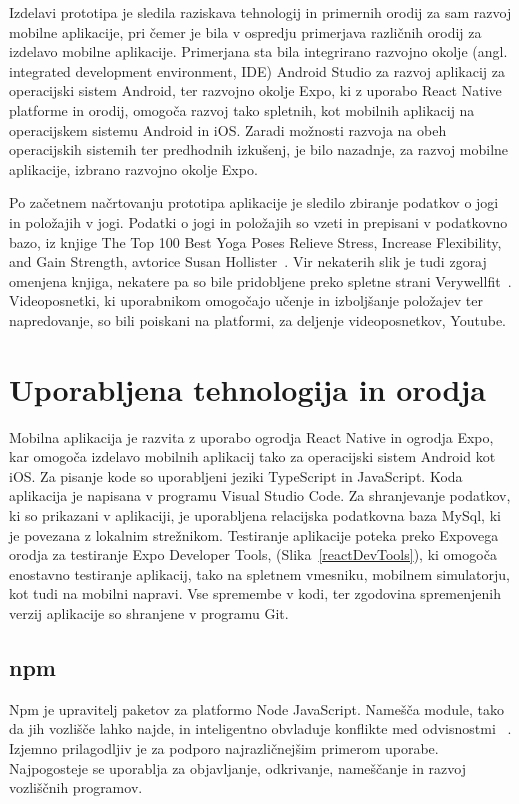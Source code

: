 \documentclass[a4paper, 12pt]{book}
\begin{document}
Izdelavi prototipa je sledila raziskava tehnologij in primernih orodij za sam razvoj mobilne aplikacije, pri čemer je bila v ospredju primerjava različnih orodij za izdelavo mobilne aplikacije. Primerjana sta bila integrirano razvojno okolje (angl. integrated development environment, IDE) Android Studio za razvoj aplikacij za operacijski sistem Android, ter razvojno okolje Expo, ki z uporabo React Native platforme in orodij, omogoča razvoj tako spletnih, kot mobilnih aplikacij na operacijskem sistemu Android in iOS. Zaradi možnosti razvoja na obeh operacijskih sistemih ter predhodnih izkušenj, je bilo nazadnje, za razvoj mobilne aplikacije, izbrano razvojno okolje Expo.

Po začetnem načrtovanju prototipa aplikacije je sledilo zbiranje podatkov o jogi in položajih v jogi. Podatki o jogi in položajih so vzeti in prepisani v podatkovno bazo, iz knjige The Top 100 Best Yoga Poses Relieve Stress, Increase Flexibility, and Gain Strength, avtorice Susan Hollister~\cite{yoga}. Vir nekaterih slik je tudi zgoraj omenjena knjiga, nekatere pa so bile pridobljene preko spletne strani Verywellfit~\cite{verywellfit}. Videoposnetki, ki uporabnikom omogočajo učenje in izboljšanje položajev ter napredovanje, so bili poiskani na platformi, za deljenje videoposnetkov, Youtube.

\chapter{Uporabljena tehnologija in orodja}
\label{ch2}
Mobilna aplikacija je razvita z uporabo ogrodja React Native in ogrodja Expo, kar omogoča izdelavo mobilnih aplikacij tako za operacijski sistem Android kot iOS. Za pisanje kode so uporabljeni jeziki TypeScript in JavaScript. Koda aplikacija je napisana v programu Visual Studio Code. Za shranjevanje podatkov, ki so prikazani v aplikaciji, je uporabljena relacijska podatkovna baza MySql, ki je povezana z lokalnim strežnikom. 
Testiranje aplikacije poteka preko Expovega orodja za testiranje Expo Developer Tools, (Slika~\ref{reactDevTools}), ki omogoča enostavno testiranje aplikacij, tako na spletnem vmesniku, mobilnem simulatorju, kot tudi na mobilni napravi. Vse spremembe v kodi, ter zgodovina spremenjenih verzij aplikacije so shranjene v programu Git.

\section{npm}
Npm je upravitelj paketov za platformo Node JavaScript. Namešča module, tako da jih vozlišče lahko najde, in inteligentno obvladuje konflikte med odvisnostmi ~\cite{npm}.  Izjemno prilagodljiv je za podporo najrazličnejšim primerom uporabe. Najpogosteje se uporablja za objavljanje, odkrivanje, nameščanje in razvoj vozliščnih programov.
\end{document}
